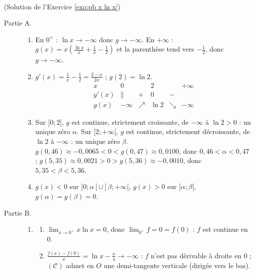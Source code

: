 \begin{corrige}
\begin{sol} ~ \\
(Solution de l'Exercice \ref{exo:pb x ln x})
\begin{description}
\item[Partie A.] \begin{enumerate}
      \item En $0^+$ : $\ln x \to -\infty$ donc $g \to -\infty$.
            En $+\infty$ : $g(x) = x\left( \frac{\ln x}{x} + \frac{1}{x} - \frac{1}{2} \right)$ et la parenth\`ese tend vers $-\frac{1}{2}$,
            donc $g \to -\infty$.
      \item $g'(x) = \frac{1}{x} - \frac{1}{2} = \frac{2 - x}{2x}$ ; $g(2) = \ln 2$.
            \[
            \begin{array}{c|ccccc}
            x & 0 & & 2 & & +\infty \\ \hline
            g'(x) & \| & + & 0 & - & \\ \hline
            g(x) & -\infty & \nearrow & \ln 2 & \searrow & -\infty
            \end{array}
            \]
      \item Sur $]0 ; 2]$, $g$ est continue, strictement croissante, de $-\infty$ \`a $\ln 2 > 0$ : un unique z\'ero $\alpha$.
            Sur $[2 ; +\infty[$, $g$ est continue, strictement d\'ecroissante, de $\ln 2$ \`a $-\infty$ : un unique z\'ero $\beta$.
            $g(0{,}46) \approx -0{,}0065 < 0 < g(0{,}47) \approx 0{,}0100$, donc $0{,}46 < \alpha < 0{,}47$ ;
            $g(5{,}35) \approx 0{,}0021 > 0 > g(5{,}36) \approx -0{,}0010$, donc $5{,}35 < \beta < 5{,}36$.
      \item $g(x) < 0$ sur $]0 ; \alpha[ \cup ]\beta ; +\infty[$, $g(x) > 0$ sur $]\alpha ; \beta[$, $g(\alpha) = g(\beta) = 0$.
      \end{enumerate}
\item[Partie B.] \begin{enumerate}
      \item \begin{enumerate}
            \item $\lim_{x \to 0^+} x\ln x = 0$, donc $\lim_{0^+} f = 0 = f(0)$ : $f$ est continue en $0$.
            \item $\frac{f(x) - f(0)}{x} = \ln x - \frac{x}{4} \to -\infty$ : $f$ n'est pas d\'erivable \`a droite en $0$ ;
                  $(\mathscr{C})$ admet en $O$ une demi-tangente verticale (dirig\'ee vers le bas).
            \end{enumerate}

\end{enumerate}
\end{description}
\end{sol}
\end{corrige}
